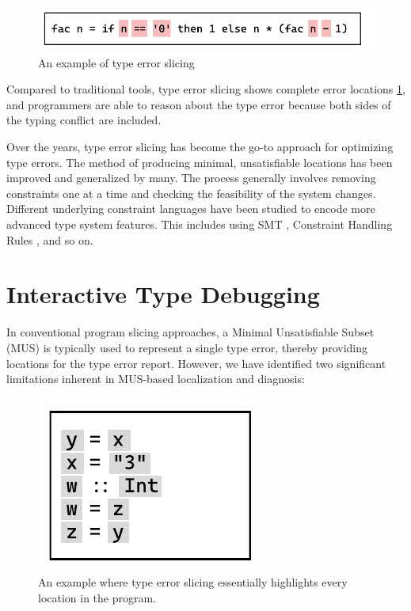 \begin{figure}[hbt]
  \includegraphics[width=0.5\linewidth]{TypeErrorSlicing.pdf}
  \caption{
    \label{fig:type-error-slicing}
      An example of type error slicing}
\end{figure}

Compared to traditional tools, type error slicing shows complete error locations \ref{fig:type-error-slicing}, and programmers are able to reason about the type error because both sides of the typing conflict are included. 

Over the years, type error slicing has become the go-to approach for optimizing type errors. The method of producing minimal, unsatisfiable locations has been improved and generalized by many. The process generally involves removing constraints one at a time and checking the feasibility of the system changes. Different underlying constraint languages have been studied to encode more advanced type system features. This includes using SMT \cite{Pavlinovic2015-ke}, Constraint Handling Rules \cite{Stuckey2003-pz}, and so on. 



\section{Interactive Type Debugging}

In conventional program slicing approaches, a Minimal Unsatisfiable Subset (MUS) is typically used to represent a single type error, thereby providing locations for the type error report. However, we have identified two significant limitations inherent in MUS-based localization and diagnosis:

\begin{figure}[hbt]
  \includegraphics[width=0.5\linewidth]{SlicingCounterExample}
  \caption{
    \label{fig:slicing-counter-example}
      An example where type error slicing essentially highlights every location in the program.}
\end{figure}

